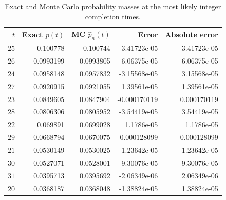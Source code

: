 \begin{table}
\caption{Exact and Monte Carlo probability masses at the most likely integer completion times.}
\label{tab:selected_discrete_pmf_values}
\begin{tabular}{rrrrr}
\toprule
$t$ & Exact $p(t)$ & MC $\widehat p_n(t)$ & Error & Absolute error \\
\midrule
$25$ & 0.100778 & 0.100744 & -3.41723e-05 & 3.41723e-05 \\
$26$ & 0.0993199 & 0.0993805 & 6.06375e-05 & 6.06375e-05 \\
$24$ & 0.0958148 & 0.0957832 & -3.15568e-05 & 3.15568e-05 \\
$27$ & 0.0920915 & 0.0921055 & 1.39561e-05 & 1.39561e-05 \\
$23$ & 0.0849605 & 0.0847904 & -0.000170119 & 0.000170119 \\
$28$ & 0.0806306 & 0.0805952 & -3.54419e-05 & 3.54419e-05 \\
$22$ & 0.069891 & 0.0699028 & 1.1786e-05 & 1.1786e-05 \\
$29$ & 0.0668794 & 0.0670075 & 0.000128099 & 0.000128099 \\
$21$ & 0.0530149 & 0.0530025 & -1.23642e-05 & 1.23642e-05 \\
$30$ & 0.0527071 & 0.0528001 & 9.30076e-05 & 9.30076e-05 \\
$31$ & 0.0395713 & 0.0395692 & -2.06349e-06 & 2.06349e-06 \\
$20$ & 0.0368187 & 0.0368048 & -1.38824e-05 & 1.38824e-05 \\
\bottomrule
\end{tabular}
\end{table}
